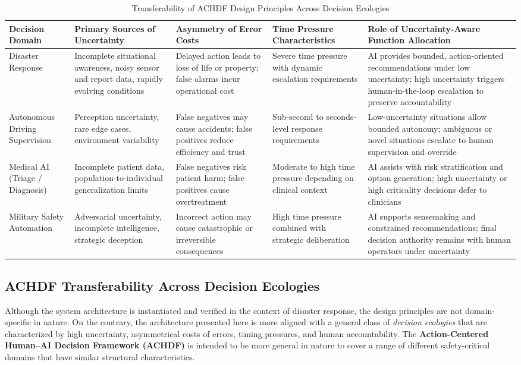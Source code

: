 \documentclass[journal]{IEEEtran}
\theoremstyle{plain}
\theoremstyle{definition}
\begin{document}
\begin{table}[t]
\centering
\caption{Transferability of ACHDF Design Principles Across Decision Ecologies}
\label{tab:achdf_transferability}
\begin{tabular}{p{3cm} p{3.2cm} p{3.2cm} p{2.8cm} p{3.9cm}}
\hline
\textbf{Decision Domain} &
\textbf{Primary Sources of Uncertainty} &
\textbf{Asymmetry of Error Costs} &
\textbf{Time Pressure Characteristics} &
\textbf{Role of Uncertainty-Aware Function Allocation} \\
\hline
Disaster Response &
Incomplete situational awareness, noisy sensor and report data, rapidly evolving conditions &
Delayed action leads to loss of life or property; false alarms incur operational cost &
Severe time pressure with dynamic escalation requirements &
AI provides bounded, action-oriented recommendations under low uncertainty; high uncertainty triggers human-in-the-loop escalation to preserve accountability \\

Autonomous Driving Supervision &
Perception uncertainty, rare edge cases, environment variability &
False negatives may cause accidents; false positives reduce efficiency and trust &
Sub-second to seconds-level response requirements &
Low-uncertainty situations allow bounded autonomy; ambiguous or novel situations escalate to human supervision and override \\

Medical AI (Triage / Diagnosis) &
Incomplete patient data, population-to-individual generalization limits &
False negatives risk patient harm; false positives cause overtreatment &
Moderate to high time pressure depending on clinical context &
AI assists with risk stratification and option generation; high uncertainty or high criticality decisions defer to clinicians \\

Military Safety Automation &
Adversarial uncertainty, incomplete intelligence, strategic deception &
Incorrect action may cause catastrophic or irreversible consequences &
High time pressure combined with strategic deliberation &
AI supports sensemaking and constrained recommendations; final decision authority remains with human operators under uncertainty \\

\hline
\end{tabular}
\end{table}


\subsection{ACHDF Transferability Across Decision Ecologies}
Although the system architecture is instantiated and verified in the context of disaster response, the design principles are not domain-specific in nature. On the contrary, the architecture presented here is more aligned with a general class of \emph{decision ecologies} that are characterized by high uncertainty, asymmetrical costs of errors, timing pressures, and human accountability. The \textbf{Action-Centered Human--AI Decision Framework (ACHDF)} is intended to be more general in nature to cover a range of different safety-critical domains that have similar structural characteristics.
\end{document}
